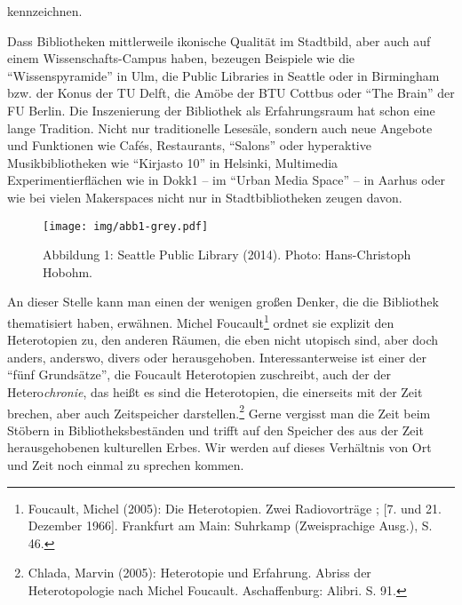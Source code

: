 kennzeichnen.

Dass Bibliotheken mittlerweile ikonische Qualität im Stadtbild, aber
auch auf einem Wissenschafts-Campus haben, bezeugen Beispiele wie die
\enquote{Wissenspyramide} in Ulm, die Public Libraries in Seattle oder
in Birmingham bzw. der Konus der TU Delft, die Amöbe der BTU Cottbus
oder \enquote{The Brain} der FU Berlin. Die Inszenierung der Bibliothek
als Erfahrungsraum hat schon eine lange Tradition. Nicht nur
traditionelle Lesesäle, sondern auch neue Angebote und Funktionen wie
Cafés, Restaurants, \enquote{Salons} oder hyperaktive Musikbibliotheken
wie \enquote{Kirjasto 10} in Helsinki, Multimedia Experimentierflächen
wie in Dokk1 -- im \enquote{Urban Media Space} -- in Aarhus oder wie bei
vielen Makerspaces nicht nur in Stadtbibliotheken zeugen davon.

\begin{figure}[htbp]
\centering
\texttt{[image: img/abb1-grey.pdf]}
\caption*{Abbildung 1: Seattle Public Library (2014). Photo: Hans-Christoph Hobohm.}
\end{figure}

An dieser Stelle kann man einen der wenigen großen Denker, die die
Bibliothek thematisiert haben, erwähnen. Michel Foucault\footnote{Foucault,
  Michel (2005): Die Heterotopien. Zwei Radiovorträge ; {[}7. und 21.
  Dezember 1966{]}. Frankfurt am Main: Suhrkamp (Zweisprachige Ausg.),
  S. 46.} ordnet sie explizit den Heterotopien zu, den anderen Räumen,
die eben nicht utopisch sind, aber doch anders, anderswo, divers oder
herausgehoben. Interessanterweise ist einer der \enquote{fünf
Grundsätze}, die Foucault Heterotopien zuschreibt, auch der der
Hetero\emph{chronie}, das heißt es sind die Heterotopien, die einerseits
mit der Zeit brechen, aber auch Zeitspeicher darstellen.\footnote{Chlada,
  Marvin (2005): Heterotopie und Erfahrung. Abriss der Heterotopologie
  nach Michel Foucault. Aschaffenburg: Alibri. S. 91.} Gerne vergisst
man die Zeit beim Stöbern in Bibliotheksbeständen und trifft auf den
Speicher des aus der Zeit herausgehobenen kulturellen Erbes. Wir werden
auf dieses Verhältnis von Ort und Zeit noch einmal zu sprechen kommen.

